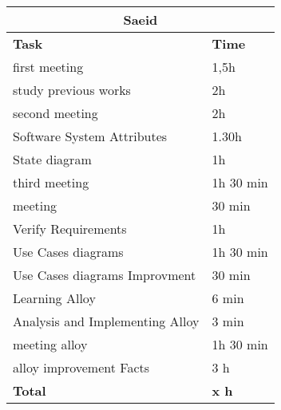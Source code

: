 \begin{table}[H]
\begin{tabular}{|l|l|}
\hline
\multicolumn{2}{|c|}{\textbf{Saeid}}            \\ \hline
\textbf{Task}                   & \textbf{Time} \\ \hline
first meeting                   & 1,5h          \\ \hline
study previous works            & 2h            \\ \hline
second meeting                  & 2h            \\ \hline
Software System Attributes      & 1.30h         \\ \hline
State diagram                   & 1h            \\ \hline
third meeting                   & 1h 30 min     \\ \hline
meeting                         & 30 min        \\ \hline
Verify Requirements             & 1h            \\ \hline
Use Cases diagrams              & 1h 30 min     \\ \hline
Use Cases diagrams Improvment   & 30 min        \\ \hline
Learning Alloy                  & 6 min         \\ \hline
Analysis and Implementing Alloy & 3 min         \\ \hline
meeting alloy                   & 1h 30 min     \\ \hline
alloy improvement Facts         & 3 h           \\ \hline
\rowcolor {polilight}
\textbf{Total}                  & \textbf{x h}   \\ \hline
\end{tabular}
\end{table}
